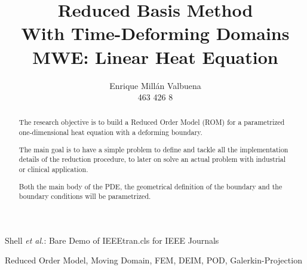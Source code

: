 \documentclass[a4paper, technote, compsoc]{IEEEtran}
\begin{document}
\onecolumn

\title{Reduced Basis Method \\ With Time-Deforming Domains \\ \large{MWE: Linear Heat Equation}}

\author{Enrique Millán Valbuena \\ \normalsize{463 426 8}}%
        
{Shell \MakeLowercase{\textit{et al.}}: Bare Demo of IEEEtran.cls for IEEE Journals}

\maketitle

\begin{abstract}
   The research objective is to build a Reduced Order Model (ROM) for a parametrized one-dimensional heat equation with a deforming boundary.

   The main goal is to have a simple problem to define and tackle all the implementation details of the reduction procedure, 
   to later on solve an actual problem with industrial or clinical application. 

   Both the main body of the PDE, the geometrical definition of the boundary and the boundary conditions will be parametrized.
   
\end{abstract}

\begin{IEEEkeywords}
    Reduced Order Model, Moving Domain, FEM, DEIM, POD, Galerkin-Projection
\end{IEEEkeywords}

\setcounter{tocdepth}{2}
\tableofcontents

\twocolumn

\newpage


\newpage

\newpage

\end{document}
